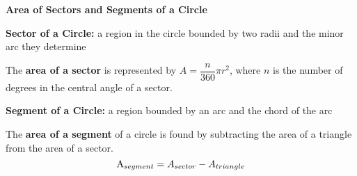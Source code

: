\begin{center}
\textbf{Area of Sectors and Segments of a Circle}
\end{center}

\vspace*{1ex}

\textbf{Sector of a Circle:} a region in the circle bounded by two radii and the minor arc they determine

\vspce 

The \textbf{area of a sector} is represented by $A = \dfrac{n}{360}\pi r^2$, where $n$ is the number of degrees in the central angle of a sector.

\vspce 

\textbf{Segment of a Circle:} a region bounded by an arc and the chord of the arc

\vspce 

The \textbf{area of a segment} of a circle is found by subtracting the area of a triangle from the area of a sector. 
\[
\text A_{segment} = A_{sector}-A_{triangle}
\] 



